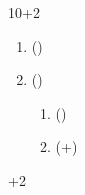 \documentclass{num_exercise}
\begin{document}
  \blindtext

  \begin{question}[subtitle=Some not so easy tasks]{10+2}
  \begin{enumerate}
    \item () \blindtext
    \item () \blindtext
    \begin{enumerate}
      \item () \blindtext
      \item (+) \blindtext
    \end{enumerate}
  \end{enumerate}
    \blindtext[1]
  \end{question}

  \begin{solution}[print]
    \blindtext[2]
  \end{solution}  

  \begin{question}{3}
    \blindtext[1]
  \end{question}  

  \begin{question}[subtitle=A bonus task]{+2}
    \blindtext
  \end{question}
\end{document}

